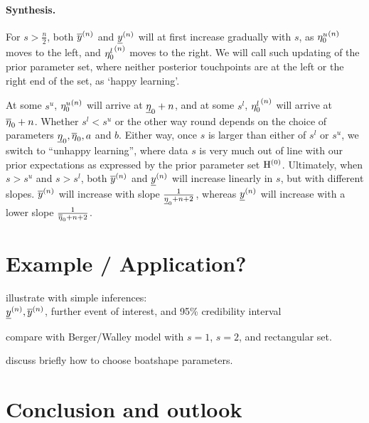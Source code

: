 

\paragraph{Synthesis.}

For $s > \frac{n}{2}$, both $\overline{y}^{(n)}$ and $\underline{y}^{(n)}$ will at first increase gradually with $s$,
as ${\eta_0^u}^{(n)}$ moves to the left, and ${\eta_0^l}^{(n)}$ moves to the right.
We will call such updating of the prior parameter set,
where neither posterior touchpoints are at the left or the right end of the set, as `happy learning'.

At some $s^u$, ${\eta_0^u}^{(n)}$ will arrive at $\underline{\eta}_0 + n$,
and at some $s^l$, ${\eta_0^l}^{(n)}$ will arrive at $\overline{\eta}_0 + n$.
Whether $s^l < s^u$ or the other way round depends on
the choice of parameters $\underline{\eta}_0, \overline{\eta}_0, a$ and $b$.
Either way, once $s$ is larger than either of $s^l$ or $s^u$,
we switch to ``unhappy learning'',
where data $s$ is very much out of line with our prior expectations as expressed
by the prior parameter set $\mathrm{H}^{(0)}$.
Ultimately, when $s > s^u$ and $s > s^l$,
both $\overline{y}^{(n)}$ and $\underline{y}^{(n)}$ will increase linearly in $s$, but with different slopes.
$\overline{y}^{(n)}$ will increase with slope $\frac{1}{\underline{\eta}_0 + n + 2}$,
whereas $\underline{y}^{(n)}$ will increase with a lower slope $\frac{1}{\overline{\eta}_0 + n + 2}$.

\section{Example / Application?}

illustrate with simple inferences:\\
$\underline{y}^{(n)}, \overline{y}^{(n)}$, further event of interest, and 95\% credibility interval

compare with Berger/Walley model with $s=1$, $s=2$, and rectangular set.

discuss briefly how to choose boatshape parameters.


\section{Conclusion and outlook}

